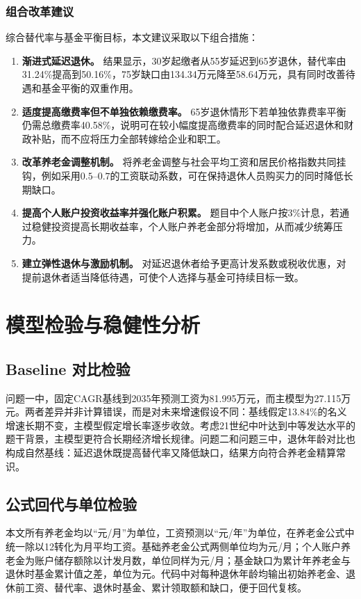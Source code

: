 \documentclass[UTF8,12pt,a4paper]{ctexart}
\begin{document}
\subsubsection{组合改革建议}
综合替代率与基金平衡目标，本文建议采取以下组合措施：
\begin{enumerate}
\item \textbf{渐进式延迟退休。} 结果显示，30岁起缴者从55岁延迟到65岁退休，替代率由31.24\%提高到50.16\%，75岁缺口由134.34万元降至58.64万元，具有同时改善待遇和基金平衡的双重作用。
\item \textbf{适度提高缴费率但不单独依赖缴费率。} 65岁退休情形下若单独依靠费率平衡仍需总缴费率40.58\%，说明可在较小幅度提高缴费率的同时配合延迟退休和财政补贴，而不应将压力全部转嫁给企业和职工。
\item \textbf{改革养老金调整机制。} 将养老金调整与社会平均工资和居民价格指数共同挂钩，例如采用$0.5$--$0.7$的工资联动系数，可在保持退休人员购买力的同时降低长期缺口。
\item \textbf{提高个人账户投资收益率并强化账户积累。} 题目中个人账户按3\%计息，若通过稳健投资提高长期收益率，个人账户养老金部分将增加，从而减少统筹压力。
\item \textbf{建立弹性退休与激励机制。} 对延迟退休者给予更高计发系数或税收优惠，对提前退休者适当降低待遇，可使个人选择与基金可持续目标一致。
\end{enumerate}

\section{模型检验与稳健性分析}
\subsection{Baseline 对比检验}
问题一中，固定CAGR基线到2035年预测工资为81.995万元，而主模型为27.115万元。两者差异并非计算错误，而是对未来增速假设不同：基线假定13.84\%的名义增速长期不变，主模型假定增长率逐步收敛。考虑21世纪中叶达到中等发达水平的题干背景，主模型更符合长期经济增长规律。问题二和问题三中，退休年龄对比也构成自然基线：延迟退休既提高替代率又降低缺口，结果方向符合养老金精算常识。

\subsection{公式回代与单位检验}
本文所有养老金均以“元/月”为单位，工资预测以“元/年”为单位，在养老金公式中统一除以12转化为月平均工资。基础养老金公式两侧单位均为元/月；个人账户养老金为账户储存额除以计发月数，单位同样为元/月；基金缺口为累计年养老金与退休时基金累计值之差，单位为元。代码中对每种退休年龄均输出初始养老金、退休前工资、替代率、退休时基金、累计领取额和缺口，便于回代复核。
\end{document}
